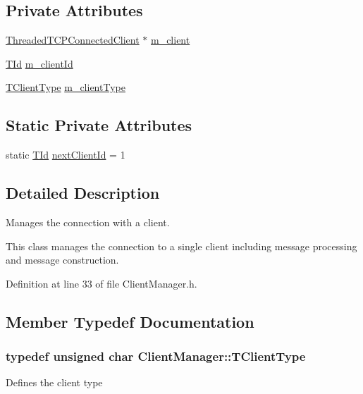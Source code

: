 \subsection*{Private Attributes}
\begin{DoxyCompactItemize}
\item 
\hyperlink{class_threaded_t_c_p_connected_client}{Threaded\-T\-C\-P\-Connected\-Client} $\ast$ \hyperlink{class_client_manager_a86ae04f2ac9f2988559a023d877f78e4}{m\-\_\-client}
\item 
\hyperlink{class_client_manager_a531e5e7eb779e8ce3c47b8eabd8e9b17}{T\-Id} \hyperlink{class_client_manager_a1216ffa88107c33825adafe63fea2263}{m\-\_\-client\-Id}
\item 
\hyperlink{class_client_manager_a223aecacabe855f08e4675b12403dfa4}{T\-Client\-Type} \hyperlink{class_client_manager_af40c31ade3f23b705bce2a8b3d311ce6}{m\-\_\-client\-Type}
\end{DoxyCompactItemize}
\subsection*{Static Private Attributes}
\begin{DoxyCompactItemize}
\item 
static \hyperlink{class_client_manager_a531e5e7eb779e8ce3c47b8eabd8e9b17}{T\-Id} \hyperlink{class_client_manager_a4f044df4d9f43367135f9d01841ec326}{next\-Client\-Id} = 1
\end{DoxyCompactItemize}


\subsection{Detailed Description}
Manages the connection with a client. 

This class manages the connection to a single client including message processing and message construction. 

Definition at line 33 of file Client\-Manager.\-h.



\subsection{Member Typedef Documentation}
\hypertarget{class_client_manager_a223aecacabe855f08e4675b12403dfa4}{
\subsubsection[{T\-Client\-Type}]{\setlength{\rightskip}{0pt plus 5cm}typedef unsigned char {\bf Client\-Manager\-::\-T\-Client\-Type}\hspace{0.3cm}{\ttfamily [private]}}}\label{class_client_manager_a223aecacabe855f08e4675b12403dfa4}
Defines the client type 

